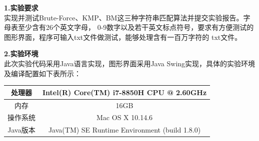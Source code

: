 \documentclass[a4paper]{article}
\begin{document}
\courseheader
{}

\info

\begin{enumerate}
  \setlength{\itemsep}{3\parskip}
  \textbf{1.实验要求}\\
  实现并测试Brute-Force、KMP、BM这三种字符串匹配算法并提交实验报告。字母表至少含有26个英文字母，
  0-9数字以及若干英文标点符号，要求有方便测试的图形界面，程序可输入txt文件做测试，能够处理含有一百万字符的
  txt文件。\\
  \bigskip

  \textbf{2.实验环境}\\
  此次实验代码采用Java语言实现，图形界面采用Java Swing实现，具体的实验环境及编译配置如下表所示：\\ \medskip
  \begin{tabular}{c|c}
    \hline\hline
    处理器 & Intel(R) Core(TM) i7-8850H CPU @ 2.60GHz \\ \hline
    内存 & 16GB\\ \hline
    操作系统& Mac OS X 10.14.6\\ \hline
    Java版本& Java(TM) SE Runtime Environment (build 1.8.0)\\ \hline
    \hline\hline
  \end{tabular}\\
  \bigskip


\end{enumerate}
\end{document}
